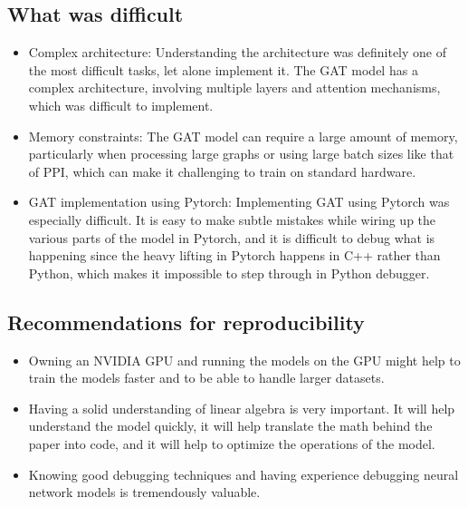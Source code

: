 \subsection{What was difficult}\label{subsec:what-was-difficult}
\begin{itemize}
    \item Complex architecture: Understanding the architecture was definitely one of the most difficult tasks, let alone implement it.
    The GAT model has a complex architecture, involving multiple layers and attention mechanisms, which was difficult to
    implement.
    \item Memory constraints: The GAT model can require a large amount of memory,
    particularly when processing large graphs or using large batch sizes like that of PPI, which can make it challenging
    to train on standard hardware.
    \item GAT implementation using Pytorch: Implementing GAT using Pytorch was especially difficult. It is easy to make subtle mistakes while wiring up the various parts of the model in Pytorch, and it is difficult to debug what is happening since the heavy lifting in Pytorch happens in C++ rather than Python, which makes it impossible to step through in Python debugger.

\end{itemize}
\subsection{Recommendations for reproducibility}\label{subsec:recommendations}
\begin{itemize}
    \item Owning an NVIDIA GPU and running the models on the GPU might help to train the models faster and to be able to handle larger datasets.
    \item Having a solid understanding of linear algebra is very important. It will help understand the model quickly, it will help translate the math behind the paper into code, and it will help to optimize the operations of the model.
    \item Knowing good debugging techniques and having experience debugging neural network models is tremendously valuable.
\end{itemize}
